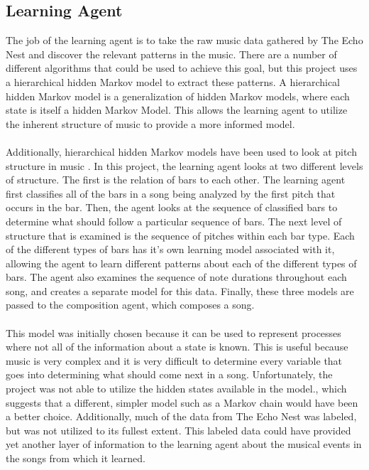 \documentclass{article}
\begin{document}
\subsection{Learning Agent}
The job of the learning agent is to take the raw music data gathered by The Echo Nest and discover the relevant patterns in the music. There are a number of different algorithms that could be used to achieve this goal, but this project uses a hierarchical hidden Markov model to extract these patterns. A hierarchical hidden Markov model is a generalization of hidden Markov models, where each state is itself a hidden Markov Model. \cite{Fine:1998:HHM:325865.325879} This allows the learning agent to utilize the inherent structure of music to provide a more informed model.\\
 \\
 Additionally, hierarchical hidden Markov models have been used to look at pitch structure in music \cite{_learningmusical}. In this project, the learning agent looks at two different levels of structure. The first is the relation of bars to each other. The learning agent first classifies all of the bars in a song being analyzed by the first pitch that occurs in the bar. Then, the agent looks at the sequence of classified bars to determine what should follow a particular sequence of bars. The next level of structure that is examined is the sequence of pitches within each bar type. Each of the different types of bars has it’s own learning model associated with it, allowing the agent to learn different patterns about each of the different types of bars. The agent also examines the sequence of note durations throughout each song, and creates a separate model for this data.  Finally, these three models are passed to the composition agent, which composes a song.\\
\\
This model was initially chosen because it can be used to represent processes where not all of the information about a state is known. This is useful because music is very complex and it is very difficult to determine every variable that goes into determining what should come next in a song. Unfortunately, the project was not able to utilize the hidden states available in the model., which suggests that a different, simpler model such as a Markov chain would have been a better choice. Additionally, much of the data from The Echo Nest was labeled, but was not utilized to its fullest extent. This labeled data could have provided yet another layer of information to the learning agent about the musical events in the songs from which it learned.\\
\end{document}
